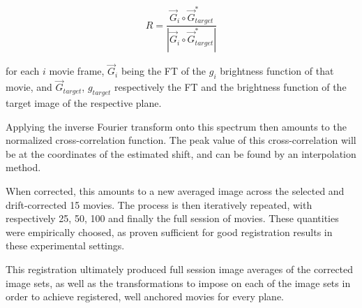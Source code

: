 \begin{equation}
R= \dfrac{\vec{G}_i \circ \vec{G}_{target}^*}{|\vec{G}_i \circ \vec{G}_{target}^*|}
\end{equation}

for each $i$ movie frame, $\vec{G}_i$ being the FT of the $g_i$ brightness function of that movie, and $\vec{G}_{target}$, $g_{target}$ respectively the FT and the brightness function of the target image of the respective plane.

Applying the inverse Fourier transform onto this spectrum then amounts to the normalized cross-correlation function. The peak value of this cross-correlation will be at the coordinates of the estimated shift, and can be found by an interpolation method.

When corrected, this amounts to a new averaged image across the selected and drift-corrected 15 movies. The process is then iteratively repeated, with respectively 25, 50, 100 and finally the full session of movies. These quantities were empirically choosed, as proven sufficient for good registration results in these experimental settings.

This registration ultimately produced full session image averages of the corrected image sets, as well as the transformations to impose on each of the image sets in order to achieve registered, well anchored movies for every plane.
